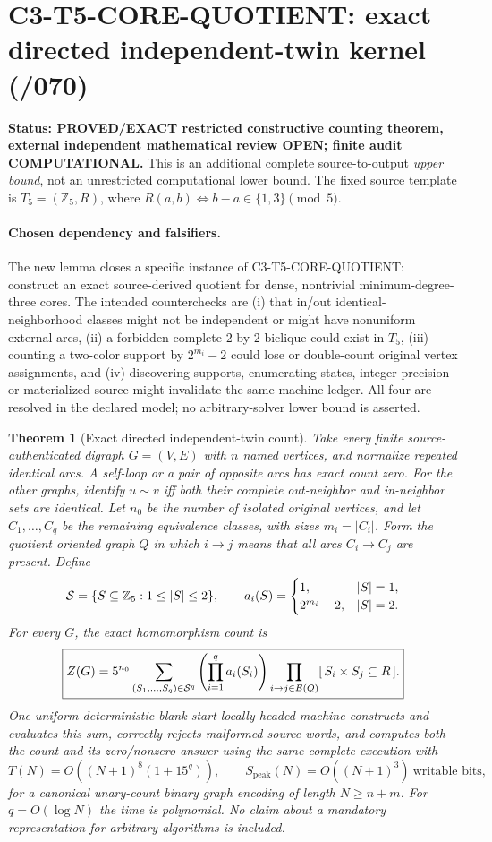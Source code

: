 \documentclass[11pt]{article}
\newtheorem{theorem}{Theorem}
\begin{document}
\section{C3-T5-CORE-QUOTIENT: exact directed independent-twin kernel (/070)}

\noindent\textbf{Status: PROVED/EXACT restricted constructive counting theorem,
external independent mathematical review OPEN; finite audit COMPUTATIONAL.}
This is an additional complete source-to-output \emph{upper bound}, not an
unrestricted computational lower bound. The fixed source template is
$T_5=(\mathbb Z_5,R)$, where
$R(a,b)\Longleftrightarrow b-a\in\{1,3\}\pmod5$.

\paragraph{Chosen dependency and falsifiers.}
The new lemma closes a specific instance of
\textsf{C3-T5-CORE-QUOTIENT}: construct an exact source-derived
quotient for dense, nontrivial minimum-degree-three cores.
The intended counterchecks are (i) that in/out identical-neighborhood
classes might not be independent or might have nonuniform external arcs,
(ii) a forbidden complete $2$-by-$2$ biclique could exist in $T_5$,
(iii) counting a two-color support by $2^{m_i}-2$ could lose or
double-count original vertex assignments, and (iv) discovering supports,
enumerating states, integer precision or materialized source
might invalidate the same-machine ledger. All four are resolved in
the declared model; no arbitrary-solver lower bound is asserted.

\begin{theorem}[Exact directed independent-twin count]
Take every finite source-authenticated digraph $G=(V,E)$
with $n$ named vertices, and normalize repeated identical arcs.
A self-loop or a pair of opposite arcs has exact count zero.
For the other graphs, identify $u\sim v$ iff both their \emph{complete}
out-neighbor and in-neighbor sets are identical. Let $n_0$ be the
number of isolated original vertices, and let
$C_1,\ldots,C_q$ be the remaining equivalence classes,
with sizes $m_i=|C_i|$. Form the quotient oriented graph $Q$
in which $i\to j$ means that \emph{all} arcs $C_i\to C_j$
are present. Define
\[
{\cal S}=\{S\subseteq\mathbb Z_5:1\le|S|\le2\},
\qquad
a_i(S)=\begin{cases}
1,&|S|=1,\\
2^{m_i}-2,&|S|=2.
\end{cases}
\]
For every $G$, the exact homomorphism count is
\[
\boxed{
Z(G)=5^{n_0}
\sum_{(S_1,\ldots,S_q)\in{\cal S}^q}
\left(\prod_{i=1}^q a_i(S_i)\right)
\prod_{i\to j\in E(Q)}
   [\,S_i\times S_j\subseteq R\,].
}
\]
One uniform deterministic blank-start locally headed machine
constructs and evaluates this sum, correctly rejects malformed source
words, and computes both the count and its zero/nonzero answer
using the \emph{same complete execution} with
\[
 \boxed{
 T(N)=O((N+1)^8(1+15^q)),\qquad
 S_{\mathrm{peak}}(N)=O((N+1)^3)\ \text{writable bits},
 }
\]
for a canonical unary-count binary graph encoding of length
$N\ge n+m$. For $q=O(\log N)$ the time is polynomial.
No claim about a mandatory representation for arbitrary algorithms
is included.
\end{theorem}
\end{document}

